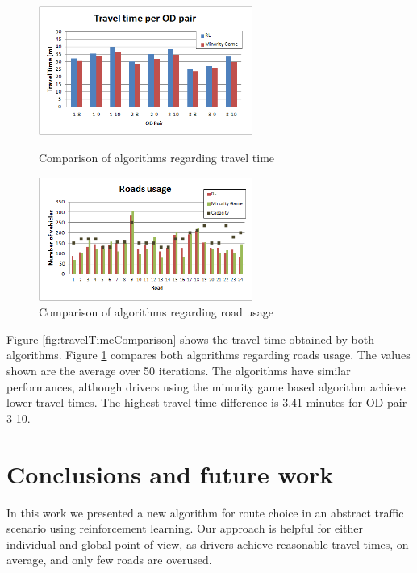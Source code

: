 \documentclass[12pt]{article}
\begin{document}
\begin{figure}[ht]
    \centerline{\includegraphics[width=7cm]{img/rl_vs_mg_traveltime.png}}
    \caption{Comparison of algorithms regarding travel time}
    \label{fig:travelTimeComparison}
\vspace*{3ex} \centering
    \centerline{\includegraphics[width=7cm]{img/roadsUsage_comparison.png}}
    \caption{Comparison of algorithms regarding road usage}
    \label{fig:roadsUsageComparison}
\end{figure}

Figure \ref{fig:travelTimeComparison} shows the travel time obtained by both algorithms. Figure \ref{fig:roadsUsageComparison} compares both algorithms regarding roads usage. The values shown are the average over 50 iterations. The algorithms have similar performances, although drivers using the minority game based algorithm achieve lower travel times. The highest travel time difference is 3.41 minutes for OD pair 3-10.



\section{Conclusions and future work}
\label{sec:conclusions}

In this work we presented a new algorithm for route choice in an abstract traffic scenario using reinforcement learning. Our approach is helpful for either individual and global point of view, as drivers achieve reasonable travel times, on average, and only few roads are overused.
\end{document}
